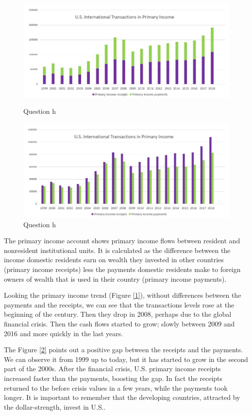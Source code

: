 \documentclass[	11pt, ]{fphw}
\begin{document}
\begin{figure}[h]
\centering 
\includegraphics[scale=0.80]{ass2eshzero.JPG} 
\caption{Question h} 
\label{1}
\includegraphics[scale=0.80]{ass2esh.JPG} 
\caption{Question h}
\label{2}
\end{figure}

The primary income account shows primary income flows between resident and nonresident institutional units. It is calculated as the difference between the income domestic residents earn on wealth they invested in other countries (primary income receipts) less the payments domestic residents make to foreign owners of wealth that is used in their country (primary income payments).
\par Looking the primary income trend (Figure \vref{1}), without differences between the payments and the receipts, we can see that the transactions levels rose at the beginning of the century. Then they drop in 2008, perhaps due to the global financial crisis. Then the cash flows started to grow; slowly between 2009 and 2016 and more quickly in the last years. 
\par The Figure \vref{2} points out a positive gap between the receipts and the payments. We can observe it from 1999 up to today, but it has started to grow in the second part of the 2000s. After the financial crisis, U.S. primary income receipts increased faster than the payments, boosting the gap. In fact the receipts returned to the before crisis values in a few years, while the payments took longer. 
It is important to remember that the developing countries, attracted by the dollar-strength, invest in U.S.. 
\end{document}
